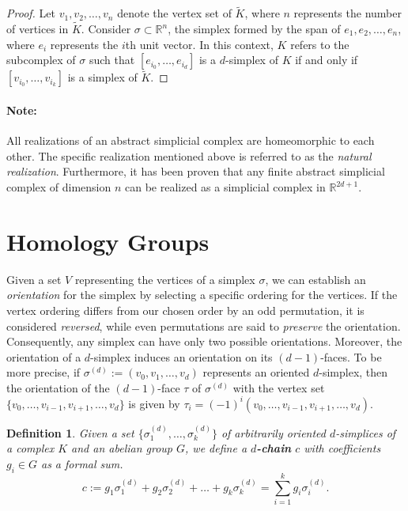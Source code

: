 \documentclass{article}
\newtheorem{definition}{Definition}[section]
\begin{document}
\begin{proof}
Let ${v_1,v_2, \ldots, v_n}$ denote the vertex set of $\tilde{K}$, where $n$ represents the number of vertices in $\tilde{K}$. Consider $\sigma \subset \mathbb{R}^n$, the simplex formed by the span of ${e_1, e_2, \ldots, e_n}$, where $e_i$ represents the $i$th unit vector. In this context, $K$ refers to the subcomplex of $\sigma$ such that $[e_{i_0}, \ldots, e_{i_d}]$ is a $d$-simplex of $K$ if and only if $[v_{i_0}, \ldots, v_{i_k}]$ is a simplex of $\tilde{K}$.
\end{proof}

\paragraph{Note:}
All realizations of an abstract simplicial complex are homeomorphic to each other. The specific realization mentioned above is referred to as the \emph{natural realization}. Furthermore, it has been proven that any finite abstract simplicial complex of dimension $n$ can be realized as a simplicial complex in $\mathbb{R}^{2d+1}$.

\section{Homology Groups}
Given a set $V$ representing the vertices of a simplex $\sigma$, we can establish an \emph{orientation} for the simplex by selecting a specific ordering for the vertices. If the vertex ordering differs from our chosen order by an odd permutation, it is considered \emph{reversed}, while even permutations are said to \emph{preserve} the orientation. Consequently, any simplex can have only two possible orientations. Moreover, the orientation of a $d$-simplex induces an orientation on its $(d-1)$-faces. To be more precise, if $\sigma^{(d)} := (v_0, v_1, \ldots, v_d)$ represents an oriented $d$-simplex, then the orientation of the $(d-1)$-face $\tau$ of $\sigma^{(d)}$ with the vertex set $\{v_0,\ldots,v_{i-1},v_{i+1},\ldots,v_d\}$ is given by $\tau_i = (-1)^i (v_0, \ldots,v_{i-1},v_{i+1},\ldots,v_d)$.

\begin{definition}
Given a set $\{\sigma_1^{(d)}, \ldots, \sigma_k^{(d)}\}$ of arbitrarily oriented $d$-simplices of a complex $K$ and an abelian group $G$, we define a \textbf{$d$-chain} $c$ with coefficients $g_i \in G$ as a formal sum.
\begin{equation}
c := g_1 \sigma^{(d)}_1 + g_2 \sigma^{(d)}_2 + \ldots + g_k \sigma^{(d)}_k = \sum_{i=1}^{k} g_i \sigma^{(d)}_i.
\end{equation}
\end{definition}
\end{document}
